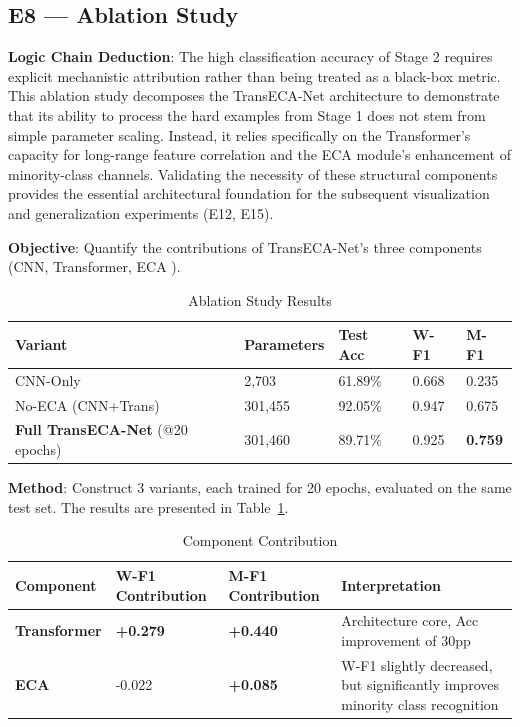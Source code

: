 \documentclass[sigconf]{acmart}
\begin{document}
\subsection{E8 --- Ablation Study}
\textbf{Logic Chain Deduction}: The high classification accuracy of Stage 2 requires explicit mechanistic attribution rather than being treated as a black-box metric. This ablation study decomposes the TransECA-Net architecture to demonstrate that its ability to process the hard examples from Stage 1 does not stem from simple parameter scaling. Instead, it relies specifically on the Transformer's capacity for long-range feature correlation and the ECA module's enhancement of minority-class channels. Validating the necessity of these structural components provides the essential architectural foundation for the subsequent visualization and generalization experiments (E12, E15).

\textbf{Objective}: Quantify the contributions of TransECA-Net's three components (CNN, Transformer, ECA \cite{18}).


\begin{table}[!t]
\caption{Ablation Study Results}
\label{tab:ablation}
\begin{tabular}{lllll}
\toprule
\textbf{Variant} & \textbf{Parameters} & \textbf{Test Acc} & \textbf{W-F1} & \textbf{M-F1} \\
\midrule
CNN-Only & 2,703 & 61.89\% & 0.668 & 0.235 \\
No-ECA (CNN+Trans) & 301,455 & 92.05\% & 0.947 & 0.675 \\
\textbf{Full TransECA-Net} (@20 epochs) & 301,460 & 89.71\% & 0.925 & \textbf{0.759} \\
\bottomrule
\end{tabular}
\end{table}

\textbf{Method}: Construct 3 variants, each trained for 20 epochs, evaluated on the same test set. The results are presented in Table~\ref{tab:ablation}.


\begin{table}[!t]
\caption{Component Contribution}
\label{tab:contribution}
\begin{tabular}{p{2.8cm}p{3.0cm}p{3.0cm}p{7.6cm}}
\toprule
\textbf{Component} & \textbf{W-F1 Contribution} & \textbf{M-F1 Contribution} & \textbf{Interpretation} \\
\midrule
\textbf{Transformer} & \textbf{+0.279} & \textbf{+0.440} & Architecture core, Acc improvement of 30pp \\
\textbf{ECA} & -0.022 & \textbf{+0.085} & W-F1 slightly decreased, but significantly improves minority class recognition \\
\bottomrule
\end{tabular}
\end{table}
\end{document}

